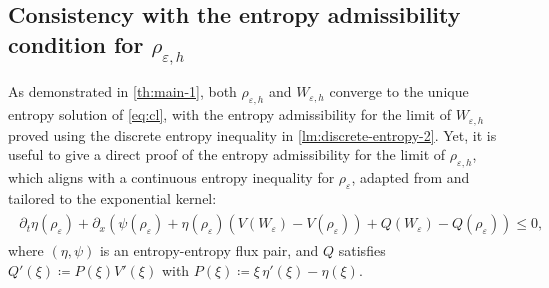 \documentclass[10pt]{amsart}
\theoremstyle{plain}
\theoremstyle{definition}
\numberwithin{equation}{section}
\newcommand{\eps}{{\varepsilon}}
\begin{document}
\subsection{Consistency with the entropy admissibility condition for \texorpdfstring{$\rho_{\eps,h}$}{rho\_eps,h}}
\label{ssec:entropy-consistency}

As demonstrated in \cref{th:main-1}, both $\rho_{\eps,h}$ and $W_{\eps,h}$ converge to the unique entropy solution of \cref{eq:cl}, with the entropy admissibility for the limit of $W_{\eps,h}$ proved using the discrete entropy inequality  in \cref{lm:discrete-entropy-2}. Yet, it is useful to give a direct proof of the entropy admissibility for the limit of $\rho_{\eps,h}$, which aligns with a continuous entropy inequality for $\rho_\eps$, adapted from \cite{MR4110434,MR4283539,MR4651679} and tailored to the exponential kernel:
\begin{align}\label{eq:entropy-exp}
\begin{aligned}
    \partial_t \eta(\rho_\varepsilon) + \partial_x \left( \psi(\rho_\varepsilon) + \eta(\rho_\varepsilon) (V(W_\varepsilon) - V(\rho_\varepsilon)) + Q(W_\varepsilon) - Q(\rho_\varepsilon) \right) \le 0,
   \end{aligned}
\end{align}
where $(\eta,\psi)$ is an entropy-entropy flux pair, and $Q$ satisfies $Q'(\xi)\coloneqq P(\xi)V'(\xi)$ with $P(\xi) \coloneqq \xi\,\eta'(\xi) - \eta(\xi)$. 
\end{document}
